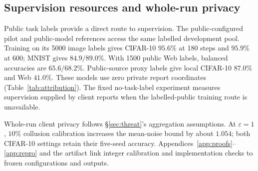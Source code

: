 \subsection{Supervision resources and whole-run privacy}
\label{sec:eval:checks}

Public task labels provide a direct route to supervision. The public-configured
pilot and public-model references access the same labelled development pool.
Training on its 5000 image labels gives CIFAR-10 $95.6\%$ at 180 steps and
$95.9\%$ at 600; MNIST gives $84.9/89.0\%$. With 1500 public Web labels,
balanced accuracies are $65.6/68.2\%$. Public-source proxy labels give local
CIFAR-10 $87.0\%$ and Web $41.0\%$. These models use zero private report
coordinates (Table~\ref{tab:attribution}). The fixed no-task-label experiment
measures supervision supplied by client reports when the labelled-public
training route is unavailable.

Whole-run client privacy follows \S\ref{sec:threat}'s aggregation assumptions.
At $\varepsilon=1$, $10\%$ collusion calibration increases the mean-noise
bound by about $1.054$; both CIFAR-10 settings retain their five-seed accuracy.
Appendices~\ref{app:proofs}--\ref{app:repro} and the artifact link integer
calibration and implementation checks to frozen configurations and outputs.
